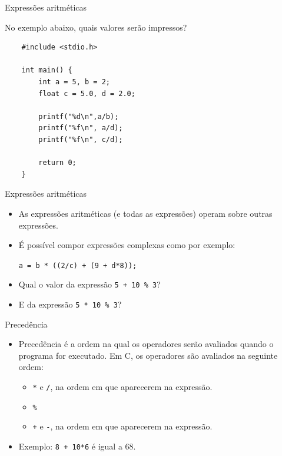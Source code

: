 \documentclass[handout]{beamer}
\begin{document}

\begin{frame}[fragile]{Expressões aritméticas}

    No exemplo abaixo, quais valores serão impressos?

    \begin{verbatim}
    #include <stdio.h>

    int main() {
        int a = 5, b = 2;
        float c = 5.0, d = 2.0;

        printf("%d\n",a/b);
        printf("%f\n", a/d);
        printf("%f\n", c/d);

        return 0;
    }
    \end{verbatim}

\end{frame}

\begin{frame}[fragile]{Expressões aritméticas}

    \begin{itemize}[<+->]
        \item As expressões aritméticas (e todas as expressões) operam sobre outras expressões.
        \item É possível compor expressões complexas como por exemplo:

        \texttt{a = b * ((2/c) + (9 + d*8));}

        \item Qual o valor da expressão \texttt{5 + 10 \% 3}?
        \item E da expressão \texttt{5 * 10 \% 3}?
    \end{itemize}

\end{frame}


\begin{frame}[fragile]{Precedência}
    \begin{itemize}[<+->]
        \item Precedência é a ordem na qual os operadores serão avaliados quando o programa for executado.
        Em C, os operadores são avaliados na seguinte ordem:

        \begin{itemize}
            \item \texttt{*} e \texttt{/}, na ordem em que aparecerem na expressão.
            \item \texttt{\%}
            \item \texttt{+} e \texttt{-}, na ordem em que aparecerem na expressão.
        \end{itemize}

        \item Exemplo: \texttt{8 + 10*6} é igual a 68.
    \end{itemize}
\end{frame}
\end{document}
